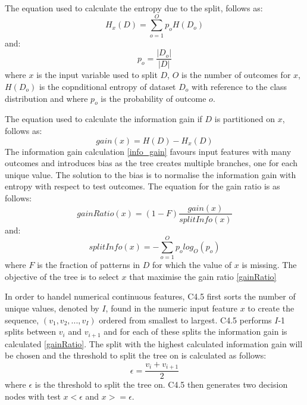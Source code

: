 \documentclass[10pt, conference]{IEEEtran}
\begin{document}
The equation used to calculate the entropy due to the split, follows as:
\begin{equation}
    H_x(D) = \sum_{o=1}^{O} p_o H(D_o)\label{entropy_x}
\end{equation}
and:
\begin{equation}
    p_o = \frac{\left\lvert D_o \right\rvert}{\left\lvert D \right\rvert}\label{o_prob}
\end{equation}
where $x$ is the input variable used to split $D$, $O$ is the number of outcomes for $x$, $H(D_o)$ is the copnditional entropy of dataset
$D_o$ with reference to the class distribution and where $p_o$ is the probability of outcome $o$.

The equation used to calculate the information gain if $D$ is partitioned on $x$, follows as:
\begin{equation}
    gain(x) = H(D) - H_x(D)\label{info_gain}
\end{equation}
The information gain calculation \eqref{info_gain} favours input features with many outcomes and introduces bias as the tree
creates multiple branches, one for each unique value. The solution to the bias is to normalise the information gain with entropy
with respect to test outcomes. The equation for the gain ratio is as follows:
\begin{equation}
    gainRatio(x) = (1-F)\frac{gain(x)}{splitInfo(x)}\label{gainRatio}
\end{equation}
and:
\begin{equation}
    splitInfo(x) = -\sum_{o=1}^{O}p_o log_O(p_o)\label{splitInfo}
\end{equation}
where $F$ is the fraction of patterns in $D$ for which the value of $x$ is missing.
The objective of the tree is to select $x$ that maximise the gain ratio \eqref{gainRatio}

In order to handel numerical continuous features, C4.5 first sorts the number of unique values, denoted by $I$,
found in the numeric input feature $x$ to create the sequence, $(v_1,v_2,...,v_I)$ ordered from smallest to largest.
C4.5 performs $I$-1 splits between $v_i$ and $v_{i+1}$ and for each of these splits the information gain is calculated \eqref{gainRatio}.
The split with the highest calculated information gain will be chosen and the threshold to split the tree on is calculated as follows:
\begin{equation}
    \epsilon = \frac{v_i + v_{i+1}}{2}\label{numeric}
\end{equation}
where $\epsilon$ is the threshold to split the tree on. C4.5 then generates two decision nodes with test $x < \epsilon$ and $x >= \epsilon$.
\end{document}
